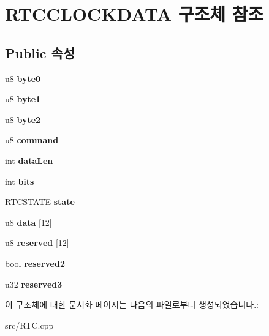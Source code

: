 \hypertarget{struct_r_t_c_c_l_o_c_k_d_a_t_a}{}\section{R\+T\+C\+C\+L\+O\+C\+K\+D\+A\+TA 구조체 참조}
\label{struct_r_t_c_c_l_o_c_k_d_a_t_a}
\subsection*{Public 속성}
\begin{DoxyCompactItemize}
\item 
\mbox{\label{struct_r_t_c_c_l_o_c_k_d_a_t_a_a6761fe56d94421e4d8a684d2dd0acad3}} 
u8 {\bfseries byte0}
\item 
\mbox{\label{struct_r_t_c_c_l_o_c_k_d_a_t_a_a7e8628728166853bb0c50a22a1071af8}} 
u8 {\bfseries byte1}
\item 
\mbox{\label{struct_r_t_c_c_l_o_c_k_d_a_t_a_a35e3e12280a58eeac5fd27e586c9b57a}} 
u8 {\bfseries byte2}
\item 
\mbox{\label{struct_r_t_c_c_l_o_c_k_d_a_t_a_a911611e39e00cb0cc98cad454768f888}} 
u8 {\bfseries command}
\item 
\mbox{\label{struct_r_t_c_c_l_o_c_k_d_a_t_a_ac87f848e9ad2f8d80c19f25c528f9fe8}} 
int {\bfseries data\+Len}
\item 
\mbox{\label{struct_r_t_c_c_l_o_c_k_d_a_t_a_a20c0f94e7e275c1d52b18be2886df0df}} 
int {\bfseries bits}
\item 
\mbox{\label{struct_r_t_c_c_l_o_c_k_d_a_t_a_aff7d87dd71426276629f84e79cf3e77a}} 
R\+T\+C\+S\+T\+A\+TE {\bfseries state}
\item 
\mbox{\label{struct_r_t_c_c_l_o_c_k_d_a_t_a_a0ba8929e9478b7a19f1d852f1b059ffd}} 
u8 {\bfseries data} \mbox{[}12\mbox{]}
\item 
\mbox{\label{struct_r_t_c_c_l_o_c_k_d_a_t_a_aa53127b494b4bcdff480d76c326a3c24}} 
u8 {\bfseries reserved} \mbox{[}12\mbox{]}
\item 
\mbox{\label{struct_r_t_c_c_l_o_c_k_d_a_t_a_ac98c4aeff33301d5ac6b4161c98c90a7}} 
bool {\bfseries reserved2}
\item 
\mbox{\label{struct_r_t_c_c_l_o_c_k_d_a_t_a_af852b907782adf7d24694ceadaebf008}} 
u32 {\bfseries reserved3}
\end{DoxyCompactItemize}


이 구조체에 대한 문서화 페이지는 다음의 파일로부터 생성되었습니다.\+:\begin{DoxyCompactItemize}
\item 
src/R\+T\+C.\+cpp\end{DoxyCompactItemize}

